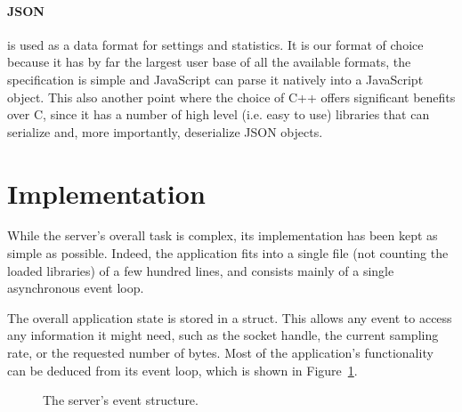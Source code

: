 \paragraph{JSON} is used  as a data format for settings  and statistics. It is
our format of  choice because it has by  far the largest user base  of all the
available formats,  the specification  is simple and  JavaScript can  parse it
natively into a JavaScript object. This also another point where the choice of
C++ offers significant  benefits over C, since  it has a number  of high level
(i.e.  easy to use)  libraries  that  can  serialize  and,  more  importantly,
deserialize JSON objects.

%
%
\section{Implementation} %
\label{sec:server:implementation}

While the server's  overall task is complex, its implementation  has been kept
as simple  as possible. Indeed, the application  fits into a single  file (not
counting the loaded libraries) of a  few hundred lines, and consists mainly of
a single asynchronous event loop.

The overall application state is stored  in a struct. This allows any event to
access any information  it might need, such as the  socket handle, the current
sampling rate,  or the requested number  of bytes.  Most of  the application's
functionality  can  be  deduced  from  its  event  loop,  which  is  shown  in
Figure~\ref{fig:server:eventstructure}.

\begin{figure}
    \centering
    
    \caption[Server Event Structure]{%
        The server's event structure.%
    }
    \label{fig:server:eventstructure}
\end{figure}

